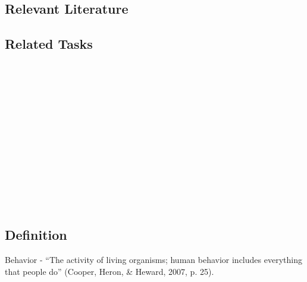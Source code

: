 \subsection{Relevant Literature}
\begin{refsection}
\nocite{test,alang2017police,clayton2018black}
\printbibliography[heading=none]
\end{refsection}
%
\subsection{Related Tasks} 
\fourbOne{}\\ 
\fourgFour{}\\
\fourgFive{}\\
\fourgSix{}\\
\fourFKOne{}\\
\fourFKTwo{}\\
\fourFKThree{}\\
\fourFKFour{}\\
\fourFKFive{}\\
\fourFKSix{}\\
\fourFKSeven{}\\
\fourFKEight{}\\
%
%
%
%
%
%
\section{\fourFKTen{}}
\subsection{Definition}  
Behavior - ``The activity of living organisms; human behavior includes everything that people do'' (Cooper, Heron, \& Heward, 2007, p. 25).

